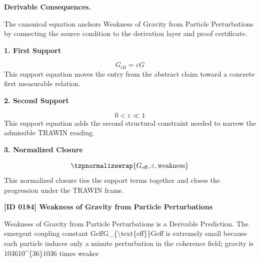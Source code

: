 \par\vspace{0.35em}
\noindent\textbf{Derivable Consequences.}\quad
\begingroup
\footnotesize
\raggedright
The canonical equation anchors Weakness of Gravity from Particle Perturbations by connecting the source condition to the derivation layer and proof certificate.
\par\endgroup

\noindent\textbf{1. First Support}\par
\[
G_{\mathrm{eff}} = \varepsilon G
\]
\noindent This support equation moves the entry from the abstract claim toward a concrete first measurable relation.\par
\noindent\textbf{2. Second Support}\par
\[
0 < \varepsilon \ll 1
\]
\noindent This support equation adds the second structural constraint needed to narrow the admissible TRAWIN reading.\par
\noindent\textbf{3. Normalized Closure}\par
\[
\tzpnormalizewrap{G_{\mathrm{eff}},\varepsilon,\text{weakness}}
\]
\noindent This normalized closure ties the support terms together and closes the progression under the TRAWIN frame.\par

\clearpage
\noindent\textbf{[ID 0184] Weakness of Gravity from Particle Perturbations}\par
\vspace{0.35em}
\begingroup\small
{}
Weakness of Gravity from Particle Perturbations is a Derivable Prediction. The emergent coupling constant GeffG\_\{\textbackslash{}text\{eff\}\}Geff is extremely small because each particle induces only a minute perturbation in the coherence field; gravity is 103610\textasciicircum{}\{36\}1036 times weaker

